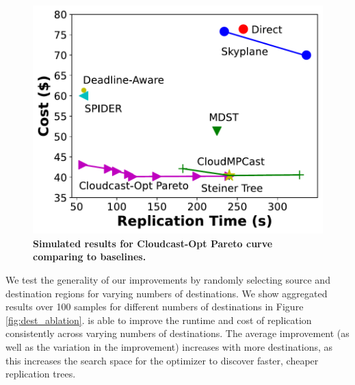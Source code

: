 \begin{figure}[t]
    \centering
    \includegraphics[width=.75\linewidth]{figures/pareto.pdf}
    \caption{\textbf{Simulated results for Cloudcast-Opt Pareto curve comparing to baselines. }}
    \label{fig:pareto}
\end{figure}


\label{random-ablation}
We test the generality of our improvements by randomly selecting source and destination regions for varying numbers of destinations. We show aggregated results over 100 samples for different numbers of destinations in Figure \ref{fig:dest_ablation}. \sys{} is able to improve the runtime and cost of replication consistently across varying numbers of destinations. The average improvement (as well as the variation in the improvement) increases with more destinations, as this increases the search space for the optimizer to discover faster, cheaper replication trees. 





